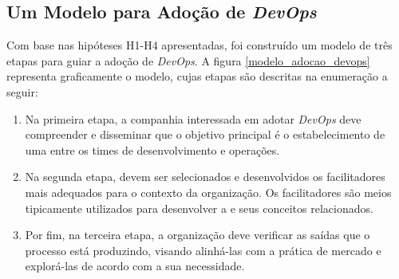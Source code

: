 \subsection{Um Modelo para Adoção de \emph{DevOps}}

Com base nas hipóteses H1-H4 apresentadas, foi construído
um modelo de três etapas para guiar a adoção de {\it DevOps}. A figura \ref{modelo_adocao_devops}
representa graficamente o modelo, cujas etapas são descritas na enumeração a
seguir:

\begin{enumerate}
\item Na primeira etapa, a companhia interessada em adotar {\it DevOps} deve
compreender e disseminar que o objetivo principal é o estabelecimento de uma
\cc entre os times de desenvolvimento e operações.

\item Na segunda etapa, devem ser selecionados e desenvolvidos os facilitadores
mais adequados para o contexto da organização. Os facilitadores são meios
tipicamente utilizados para desenvolver a \cc e seus conceitos relacionados.

\item Por fim, na terceira etapa, a organização deve verificar as saídas que o
processo está produzindo, visando alinhá-las com a prática de mercado e
explorá-las de acordo com a sua necessidade.

\end{enumerate}

